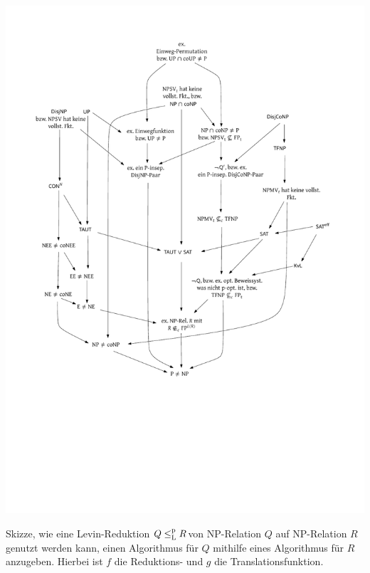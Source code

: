 \begin{marginfigure}
    \centering\includegraphics[page=10]{figures.pdf}\vspace*{2ex}
    \caption{Skizze, wie eine Levin-Reduktion $Q\leq_\mathrm{L}^\mathrm{p} R$von NP-Relation $Q$ auf NP-Relation $R$ genutzt werden kann, einen Algorithmus für $Q$ mithilfe eines Algorithmus für $R$ anzugeben. Hierbei ist $f$ die Reduktions- und $g$ die Translationsfunktion.}
\end{marginfigure}

